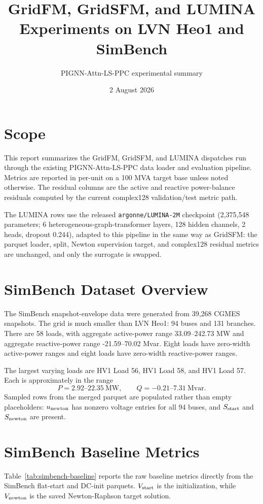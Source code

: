 \documentclass[10pt]{article}
\title{GridFM, GridSFM, and LUMINA Experiments on LVN Heo1 and SimBench}
\author{PIGNN-Attn-LS-PPC experimental summary}
\date{2 August 2026}
\begin{document}
\maketitle

\section*{Scope}
This report summarizes the GridFM, GridSFM, and LUMINA dispatches run through the existing PIGNN-Attn-LS-PPC data loader and evaluation pipeline. Metrics are reported in per-unit on a 100 MVA target base unless noted otherwise. The residual columns are the active and reactive power-balance residuals computed by the current complex128 validation/test metric path.

The LUMINA rows use the released \texttt{argonne/LUMINA-2M} checkpoint (2{,}375{,}548 parameters; 6 heterogeneous-graph-transformer layers, 128 hidden channels, 2 heads, dropout 0.244), adapted to this pipeline in the same way as GridSFM: the parquet loader, split, Newton supervision target, and complex128 residual metrics are unchanged, and only the surrogate is swapped.

\section*{SimBench Dataset Overview}
The SimBench snapshot-envelope data were generated from 39,268 CGMES snapshots. The grid is much smaller than LVN Heo1: 94 buses and 131 branches. There are 58 loads, with aggregate active-power range 33.09--242.73 MW and aggregate reactive-power range -21.59--70.02 Mvar. Eight loads have zero-width active-power ranges and eight loads have zero-width reactive-power ranges.

The largest varying loads are HV1 Load 56, HV1 Load 58, and HV1 Load 57. Each is approximately in the range
\[
P = 2.92\text{--}22.35\ \mathrm{MW}, \qquad
Q = -0.21\text{--}7.31\ \mathrm{Mvar}.
\]
Sampled rows from the merged parquet are populated rather than empty placeholders: \(u_{\rm newton}\) has nonzero voltage entries for all 94 buses, and \(S_{\rm start}\) and \(S_{\rm newton}\) are present.

\section*{SimBench Baseline Metrics}
Table~\ref{tab:simbench-baseline} reports the raw baseline metrics directly from the SimBench flat-start and DC-init parquets. \(V_{\rm start}\) is the initialization, while \(V_{\rm newton}\) is the saved Newton-Raphson target solution.
\end{document}
